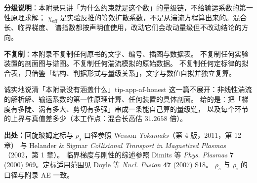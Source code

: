 \textbf{分级说明}：本附录只讲「为什么约束就是这个数」的量级链，不给输运系数的第一性原理求解；
$\chi_{\mathrm{eff}}$ 是实验反推的等效扩散系数，不是从湍流方程算出来的。混合长、临界梯度、
谱指数都按声明值使用，改动它们会改动量级但不改动结论的方向。

\textbf{不复制}：本附录不复制任何原书的文字、编号、插图与数据表。
不复制任何实验装置的剖面图与谱图。不复制任何湍流模拟的原始数据。
不复制任何定标律的拟合表，只借鉴「结构、判据形式与量级关系」，文字与数值自拟并独立复算。

\begin{tip}{诚实地说清「本附录没有涵盖什么」}{tip-app-af-honest}
这一篇不展开：非线性湍流的解析解、输运系数的第一性原理计算、任何装置的具体剖面。
给的是：把「梯度有多陡、涡有多大、剪切有多强」串成一条能自己算的量级链，
以及每个环节的上界与真值差多少（本工作点：混合长高估 $31.2658$ 倍）。
\end{tip}

\textbf{出处：}回旋玻姆定标与 $\rho_s$ 口径参照 Wesson \emph{Tokamaks}（第 4 版，2011，第 12 章）
与 Helander \& Sigmar \emph{Collisional Transport in Magnetized Plasmas}（2002，第 1 章）。
临界梯度与刚性的综述参照 Dimits 等 \emph{Phys. Plasmas} \textbf{7} (2000) 969。定标适用范围见 Doyle 等 \emph{Nucl. Fusion} \textbf{47} (2007) S18。
$\rho_s$ 与 $\rho_i$ 的口径与附录 AE 一致。
\endgroup